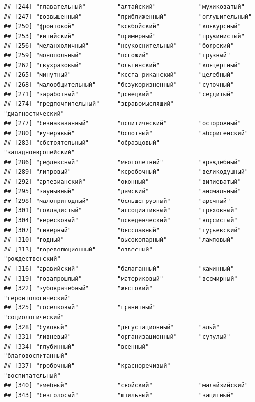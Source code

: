 \documentclass[11pt]{article}\usepackage[]{graphicx}\usepackage[]{color}
\makeatletter
\newenvironment{kframe}{%
 \def\at@end@of@kframe{}%
 \ifinner\ifhmode%
  \def\at@end@of@kframe{\end{minipage}}%
  \begin{minipage}{\columnwidth}%
 \fi\fi%
 \def\FrameCommand##1{\hskip\@totalleftmargin \hskip-\fboxsep
 \colorbox{shadecolor}{##1}\hskip-\fboxsep
     \hskip-\linewidth \hskip-\@totalleftmargin \hskip\columnwidth}%
 \MakeFramed {\advance\hsize-\width
   \@totalleftmargin\z@ \linewidth\hsize
   \@setminipage}}%
 {\par\unskip\endMakeFramed%
 \at@end@of@kframe}
\newenvironment{knitrout}{}{} %
\makeatother
\begin{document}
\begin{knitrout}
\begin{kframe}
\begin{verbatim}
## [244] "плавательный"         "алтайский"            "мужиковатый"         
## [247] "возвышенный"          "приближенный"         "оглушительный"       
## [250] "фронтовой"            "ковбойский"           "конкурсный"          
## [253] "китийский"            "примерный"            "пружинистый"         
## [256] "меланхоличный"        "неукоснительный"      "боярский"            
## [259] "монопольный"          "погожий"              "грузный"             
## [262] "двухразовый"          "ольгинский"           "концертный"          
## [265] "минутный"             "коста-риканский"      "целебный"            
## [268] "малообщительный"      "безукоризненный"      "суточный"            
## [271] "заработный"           "донецкий"             "сердитый"            
## [274] "предпочтительный"     "здравомыслящий"       "диагностический"     
## [277] "безнаказанный"        "политический"         "осторожный"          
## [280] "кучерявый"            "болотный"             "аборигенский"        
## [283] "обстоятельный"        "образцовый"           "западноевропейский"  
## [286] "рефлексный"           "многолетний"          "враждебный"          
## [289] "литровый"             "коробочный"           "великодушный"        
## [292] "артезианский"         "оконный"              "витиеватый"          
## [295] "заунывный"            "дамский"              "аномальный"          
## [298] "малопригодный"        "большегрузный"        "арочный"             
## [301] "покладистый"          "ассоциативный"        "греховный"           
## [304] "вересковый"           "поведенческий"        "ворсистый"           
## [307] "ливерный"             "бесславный"           "гурьевский"          
## [310] "годный"               "высокопарный"         "ламповый"            
## [313] "дореволюционный"      "отвесный"             "рождественский"      
## [316] "аравийский"           "балаганный"           "каминный"            
## [319] "позапрошлый"          "материковый"          "всемирный"           
## [322] "зубоврачебный"        "жестокий"             "геронтологический"   
## [325] "поселковый"           "гранитный"            "социологический"     
## [328] "буковый"              "дегустационный"       "алый"                
## [331] "ливневый"             "организационный"      "сутулый"             
## [334] "глубинный"            "военный"              "благовоспитанный"    
## [337] "пробочный"            "красноречивый"        "воспитательный"      
## [340] "амебный"              "свойский"             "малайзийский"        
## [343] "безголосый"           "штильный"             "защитный"            

\end{verbatim}
\end{kframe}
\end{knitrout}
\end{document}
